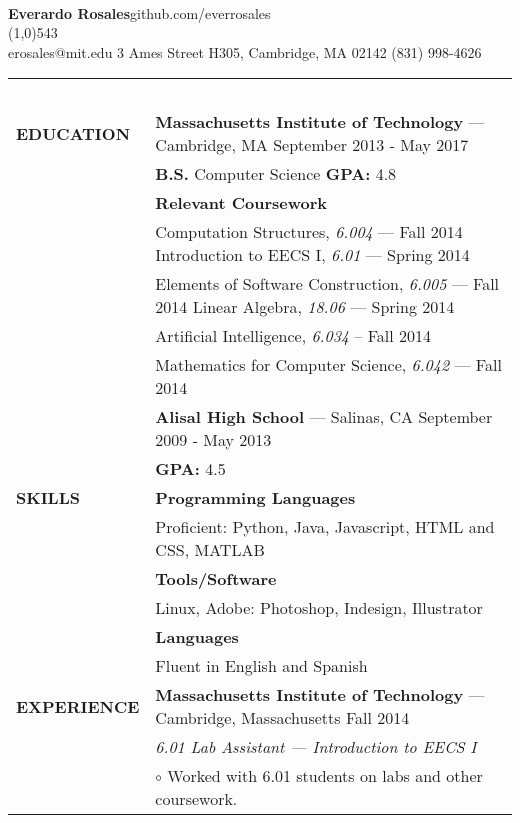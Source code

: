 \documentclass[11pt,letterpaper]{article}
\begin{document}
\raggedright
\ \\

\textbf{\huge{Everardo Rosales}}\hfill github.com/everrosales\\
\vspace{-8pt}
\line(1,0){543}\\
erosales@mit.edu \hfill 3 Ames Street H305, Cambridge, MA 02142 \hfill (831)
998-4626\\
\vspace{5pt}

\begin{tabular}{@{}lp{6.6in}}
\ \\
\textbf{EDUCATION}
&\textbf{Massachusetts Institute of Technology} --- Cambridge, MA \hfill September 2013 - May 2017\\
&\textbf{B.S.} Computer Science \qquad \textbf{GPA:} 4.8\\
&\textbf{Relevant Coursework}\\
&\hspace{10pt} Computation Structures, \emph{6.004} --- Fall 2014 \hspace{57pt} Introduction to EECS I, \emph{6.01} --- Spring 2014\\
&\hspace{10pt} Elements of Software Construction, \emph{6.005} --- Fall 2014 \hspace{10pt} Linear Algebra, \emph{18.06} --- Spring 2014\\
&\hspace{10pt} Artificial Intelligence, \emph{6.034} -- Fall 2014 \\
&\hspace{10pt} Mathematics for Computer Science, \emph{6.042} --- Fall 2014\\
&\textbf{Alisal High School} --- Salinas, CA \hfill September 2009 - May 2013\\
&\textbf{GPA:} 4.5\\

\textbf{SKILLS}
&\textbf{Programming Languages}\\
&Proficient: Python, Java, Javascript, HTML and CSS, MATLAB\\
&\textbf{Tools/Software}\\
&Linux, Adobe: Photoshop, Indesign, Illustrator\\
&\textbf{Languages}\\
&Fluent in English and Spanish\\

\textbf{EXPERIENCE}
&\textbf{Massachusetts Institute of Technology} --- Cambridge, Massachusetts \hfill Fall 2014\\
&\emph{6.01 Lab Assistant --- Introduction to EECS I}\\
&\hspace{10pt}$\circ$ Worked with 6.01 students on labs and other coursework.\\


\end{tabular}
\end{document}
